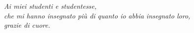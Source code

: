 \chapter*{}
\begin{flushright}
	\textit{Ai miei studenti e studentesse, \\ che mi hanno insegnato più di quanto io abbia insegnato loro, \\ grazie di cuore.}
\end{flushright}